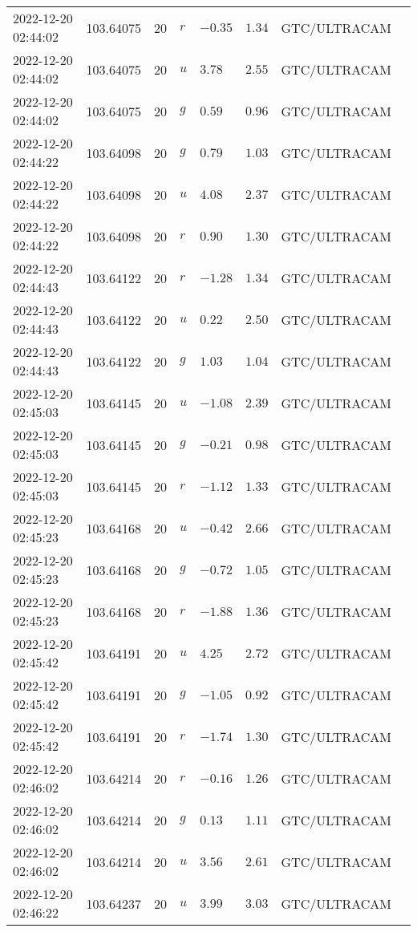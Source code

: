 \documentclass{nature_plusfigure}
\begin{document}
\begin{supplement}
\begin{center}
\begin{longtable}{llllllll}
2022-12-20 02:44:02 & 103.64075 & 20 & $r$ & $-0.35$ & $1.34$ & GTC/ULTRACAM &  \\ 
2022-12-20 02:44:02 & 103.64075 & 20 & $u$ & $3.78$ & $2.55$ & GTC/ULTRACAM &  \\ 
2022-12-20 02:44:02 & 103.64075 & 20 & $g$ & $0.59$ & $0.96$ & GTC/ULTRACAM &  \\ 
2022-12-20 02:44:22 & 103.64098 & 20 & $g$ & $0.79$ & $1.03$ & GTC/ULTRACAM &  \\ 
2022-12-20 02:44:22 & 103.64098 & 20 & $u$ & $4.08$ & $2.37$ & GTC/ULTRACAM &  \\ 
2022-12-20 02:44:22 & 103.64098 & 20 & $r$ & $0.90$ & $1.30$ & GTC/ULTRACAM &  \\ 
2022-12-20 02:44:43 & 103.64122 & 20 & $r$ & $-1.28$ & $1.34$ & GTC/ULTRACAM &  \\ 
2022-12-20 02:44:43 & 103.64122 & 20 & $u$ & $0.22$ & $2.50$ & GTC/ULTRACAM &  \\ 
2022-12-20 02:44:43 & 103.64122 & 20 & $g$ & $1.03$ & $1.04$ & GTC/ULTRACAM &  \\ 
2022-12-20 02:45:03 & 103.64145 & 20 & $u$ & $-1.08$ & $2.39$ & GTC/ULTRACAM &  \\ 
2022-12-20 02:45:03 & 103.64145 & 20 & $g$ & $-0.21$ & $0.98$ & GTC/ULTRACAM &  \\ 
2022-12-20 02:45:03 & 103.64145 & 20 & $r$ & $-1.12$ & $1.33$ & GTC/ULTRACAM &  \\ 
2022-12-20 02:45:23 & 103.64168 & 20 & $u$ & $-0.42$ & $2.66$ & GTC/ULTRACAM &  \\ 
2022-12-20 02:45:23 & 103.64168 & 20 & $g$ & $-0.72$ & $1.05$ & GTC/ULTRACAM &  \\ 
2022-12-20 02:45:23 & 103.64168 & 20 & $r$ & $-1.88$ & $1.36$ & GTC/ULTRACAM &  \\ 
2022-12-20 02:45:42 & 103.64191 & 20 & $u$ & $4.25$ & $2.72$ & GTC/ULTRACAM &  \\ 
2022-12-20 02:45:42 & 103.64191 & 20 & $g$ & $-1.05$ & $0.92$ & GTC/ULTRACAM &  \\ 
2022-12-20 02:45:42 & 103.64191 & 20 & $r$ & $-1.74$ & $1.30$ & GTC/ULTRACAM &  \\ 
2022-12-20 02:46:02 & 103.64214 & 20 & $r$ & $-0.16$ & $1.26$ & GTC/ULTRACAM &  \\ 
2022-12-20 02:46:02 & 103.64214 & 20 & $g$ & $0.13$ & $1.11$ & GTC/ULTRACAM &  \\ 
2022-12-20 02:46:02 & 103.64214 & 20 & $u$ & $3.56$ & $2.61$ & GTC/ULTRACAM &  \\ 
2022-12-20 02:46:22 & 103.64237 & 20 & $u$ & $3.99$ & $3.03$ & GTC/ULTRACAM &  \\ 

\end{longtable}
\end{center}
\end{supplement}
\end{document}
